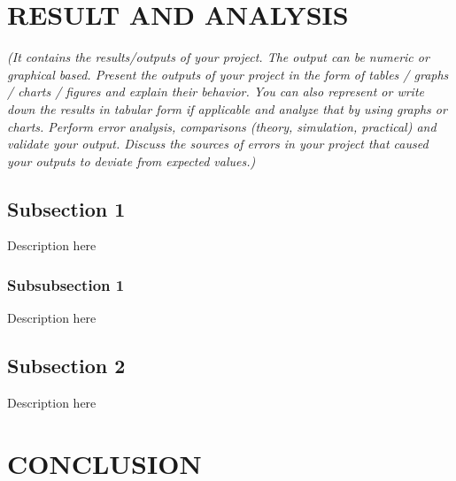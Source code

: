 \section{\MakeUppercase{Result and Analysis}}
    \textit{(It contains the results/outputs of your project. The output can be numeric or graphical based. Present the outputs of your project in the form of tables / graphs / charts / figures and explain their behavior. You can also represent or write down the results in tabular form if applicable and analyze that by using graphs or charts. Perform error analysis, comparisons (theory, simulation, practical) and validate your output. Discuss the sources of errors in your project that caused your outputs to deviate from expected values.)
    }

    \subsection{Subsection 1}
        Description here
        \subsubsection{Subsubsection 1}
            Description here
    \subsection{Subsection 2}
        Description here

    \pagebreak

\section{\MakeUppercase{Conclusion}}
    \lipsum[2]

